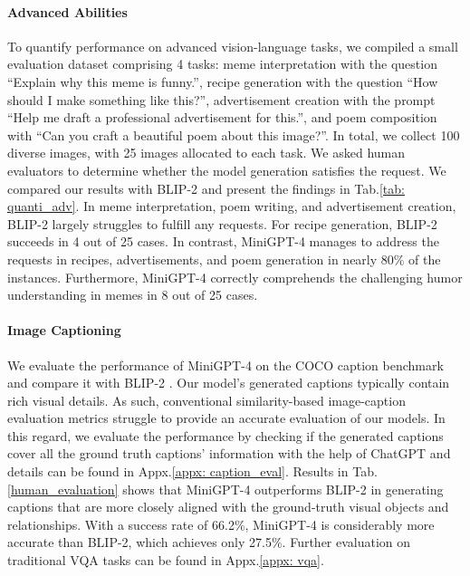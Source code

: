 \paragraph{Advanced Abilities}
To quantify performance on advanced vision-language tasks, we compiled a small evaluation dataset comprising 4 tasks: meme interpretation with the question ``Explain why this meme is funny.'', recipe generation with the question ``How should I make something like this?'', advertisement creation with the prompt ``Help me draft a professional advertisement for this.'', and poem composition with ``Can you craft a beautiful poem about this image?''.
In total, we collect 100 diverse images, with 25 images allocated to each task.
We asked human evaluators to determine whether the model generation satisfies the request.
We compared our results with BLIP-2 \citep{blip2} and present the findings in Tab.\ref{tab: quanti_adv}. In meme interpretation, poem writing, and advertisement creation, BLIP-2 largely struggles to fulfill any requests. For recipe generation, BLIP-2 succeeds in 4 out of 25 cases. In contrast, MiniGPT-4 manages to address the requests in recipes, advertisements, and poem generation in nearly 80\% of the instances. Furthermore, MiniGPT-4 correctly comprehends the challenging humor understanding in memes in 8 out of 25 cases.






\paragraph{Image Captioning} We evaluate the performance of MiniGPT-4 on the COCO caption benchmark and compare it with BLIP-2 \citep{blip2}. 
Our model's generated captions typically contain rich visual details. As such, conventional similarity-based image-caption evaluation metrics struggle to provide an accurate evaluation of our models. 
In this regard, we evaluate the performance by checking if the generated captions cover all the ground truth captions' information with the help of ChatGPT and details can be found in Appx.\ref{appx: caption_eval}. Results in Tab.\ref{human_evaluation} shows that MiniGPT-4 outperforms BLIP-2 in generating captions that are more closely aligned with the ground-truth visual objects and relationships. With a success rate of 66.2\%, MiniGPT-4 is considerably more accurate than BLIP-2, which achieves only 27.5\%. 
Further evaluation on traditional VQA tasks can be found in Appx.\ref{appx: vqa}.















